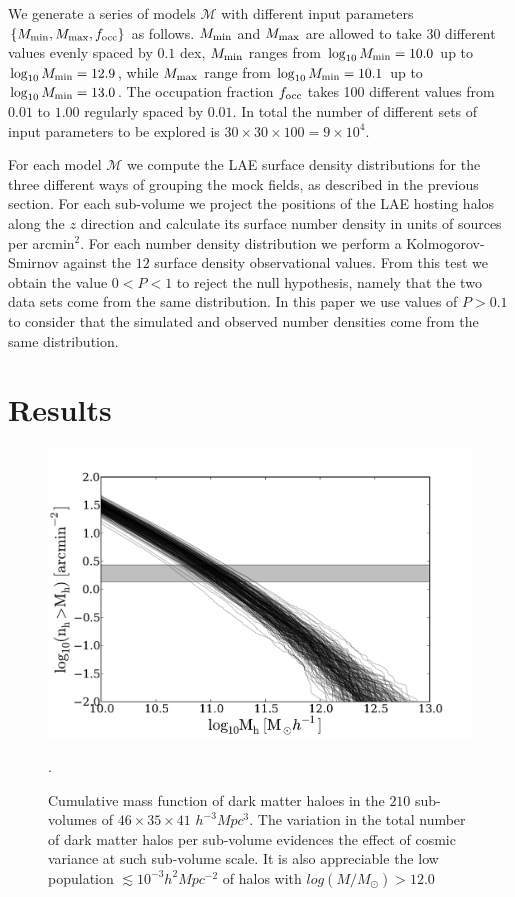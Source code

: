 \documentclass[usenatbib]{mn2e}
\begin{document}
We generate a series of models ${\mathcal M}$ with different input
parameters$\{M_{\rm min}, M_{\rm max}, f_{\rm occ}\}$ as
follows. $M_{\rm min}$ and $M_{\rm max}$ are allowed to take 30
different values evenly spaced by $0.1$ dex, $M_{\rm min}$ ranges from
$\log_{10}M_{\rm min}=10.0$ up to $\log_{10}M_{\rm min}=12.9$, while
$M_{\rm max}$ range  from $\log_{10}M_{\rm min}=10.1$ up to
$\log_{10}M_{\rm min}=13.0$. The occupation fraction $f_{\rm occ}$
takes 100 different values from $0.01$ to $1.00$ regularly spaced by
$0.01$. In total the number of different sets of input parameters to
be explored is $30 \times 30\times 100 = 9\times 10^{4}$. 

For each model ${\mathcal M}$ we compute the LAE surface density
distributions for the three different ways of grouping the mock
fields, as described in the previous section. For each sub-volume we
project the positions of the LAE hosting halos along the $z$ direction
and calculate its surface number density in units of sources per
arcmin$^{2}$. For each number density distribution we perform a
Kolmogorov-Smirnov against the $12$ surface density observational
values. From this test we obtain the value $0<P<1$ to reject the null
hypothesis, namely that the two data sets come from the same
distribution. In this paper we use values of $P>0.1$ to consider that
the simulated and observed number densities come from the same
distribution. 

\section{Results}


\begin{figure}
\begin{center}
\includegraphics[width=1.00\linewidth,angle=0]{./plots/Fig1.pdf}
\caption{ \label{figure:laes_dist} Cumulative mass function of dark
  matter haloes in the $210$ sub-volumes of $46\times 35\times 41$
  $h^{-3}Mpc^{3}$. The variation in the total number of dark matter
  halos per sub-volume  evidences the effect of cosmic variance at
  such sub-volume scale. It is also appreciable the low population
  $\lesssim10^{-3}h^{2}Mpc^{-2}$ of halos with
  $log(M/M_{\odot})>12.0$}. 
\end{center} 
\end{figure}
\end{document}
